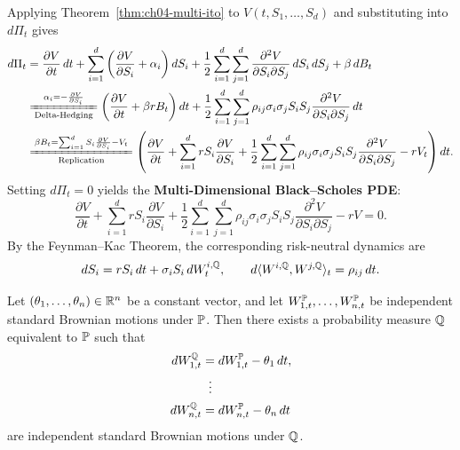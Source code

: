 Applying Theorem~\ref{thm:ch04-multi-ito} to $V(t, S_1, \dots, S_d)$ and substituting into $d\Pi_t$ gives
\begin{align*}
    d\Pi_t
    &= \frac{\partial V}{\partial t}\,dt + \sum_{i=1}^d \left(\frac{\partial V}{\partial S_i} + \alpha_i\right)dS_i
    + \frac{1}{2}\sum_{i=1}^d \sum_{j=1}^d \frac{\partial^2 V}{\partial S_i \partial S_j}\,dS_i\,dS_j + \beta\,dB_t \\
    &\xlongequal[\text{Delta-Hedging}]{\alpha_i = -\frac{\partial V}{\partial S_i}}
    \left(\frac{\partial V}{\partial t} + \beta r B_t\right)dt
    + \frac{1}{2}\sum_{i=1}^d \sum_{j=1}^d \rho_{ij}\sigma_i \sigma_j S_i S_j \frac{\partial^2 V}{\partial S_i \partial S_j}\,dt \\
    &\xlongequal[\text{Replication}]{\beta B_t = \sum_{i=1}^d S_i \frac{\partial V}{\partial S_i} - V_t}
    \left(\frac{\partial V}{\partial t} + \sum_{i=1}^d r S_i \frac{\partial V}{\partial S_i} + \frac{1}{2}\sum_{i=1}^d \sum_{j=1}^d \rho_{ij}\sigma_i \sigma_j S_i S_j \frac{\partial^2 V}{\partial S_i \partial S_j} - r V_t\right)dt.
\end{align*}
Setting $d\Pi_t = 0$ yields the \textbf{Multi-Dimensional Black--Scholes PDE}:
\begin{equation}
    \label{eq:ch04-multi-bs-pde}
    \frac{\partial V}{\partial t} + \sum_{i=1}^d r S_i \frac{\partial V}{\partial S_i} + \frac{1}{2}\sum_{i=1}^d \sum_{j=1}^d \rho_{ij}\sigma_i \sigma_j S_i S_j \frac{\partial^2 V}{\partial S_i \partial S_j} - r V = 0.
\end{equation}
By the Feynman--Kac Theorem, the corresponding risk-neutral dynamics are
\[
    dS_i = r S_i\,dt + \sigma_i S_i\,dW_t^{i,\mathbb{Q}}, \qquad d\langle W^{i,\mathbb{Q}}, W^{j,\mathbb{Q}}\rangle_t = \rho_{ij}\,dt.
\]

\begin{theorem}
    \label{thm:ch04-multi-girsanov}
    Let $(\theta_1, \dots, \theta_n) \in \mathbb{R}^n$ be a constant vector, and let $W_{1,t}^{\mathbb{P}}, \dots, W_{n,t}^{\mathbb{P}}$ be independent standard Brownian motions under $\mathbb{P}$. Then there exists a probability measure $\mathbb{Q}$ equivalent to $\mathbb{P}$ such that
    \begin{align*}
        dW_{1,t}^{\mathbb{Q}} &= dW_{1,t}^{\mathbb{P}} - \theta_1\,dt, \\
        &\;\;\vdots \\
        dW_{n,t}^{\mathbb{Q}} &= dW_{n,t}^{\mathbb{P}} - \theta_n\,dt
    \end{align*}
    are independent standard Brownian motions under $\mathbb{Q}$.
\end{theorem}

